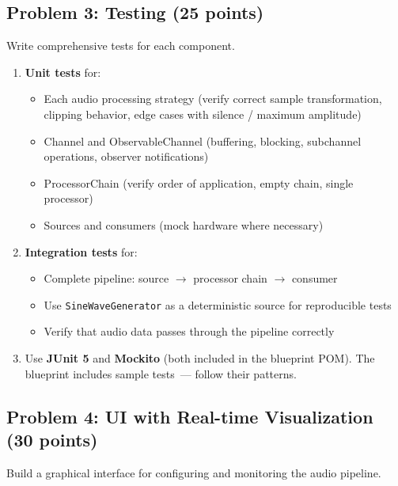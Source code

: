 \documentclass[a4paper,12pt]{article}
\begin{document}
\subsection{Problem 3: Testing \hfill \textbf{(25 points)}}

Write comprehensive tests for each component.

\begin{enumerate}
    \item \textbf{Unit tests} for:
    \begin{itemize}
        \item Each audio processing strategy (verify correct sample transformation,
              clipping behavior, edge cases with silence / maximum amplitude)
        \item Channel and ObservableChannel (buffering, blocking, subchannel operations,
              observer notifications)
        \item ProcessorChain (verify order of application, empty chain, single processor)
        \item Sources and consumers (mock hardware where necessary)
    \end{itemize}

    \item \textbf{Integration tests} for:
    \begin{itemize}
        \item Complete pipeline: source $\to$ processor chain $\to$ consumer
        \item Use \texttt{SineWaveGenerator} as a deterministic source for reproducible tests
        \item Verify that audio data passes through the pipeline correctly
    \end{itemize}

    \item Use \textbf{JUnit 5} and \textbf{Mockito} (both included in the blueprint POM).
          The blueprint includes sample tests~--- follow their patterns.
\end{enumerate}

\subsection{Problem 4: UI with Real-time Visualization \hfill \textbf{(30 points)}}

Build a graphical interface for configuring and monitoring the audio pipeline.
\end{document}

